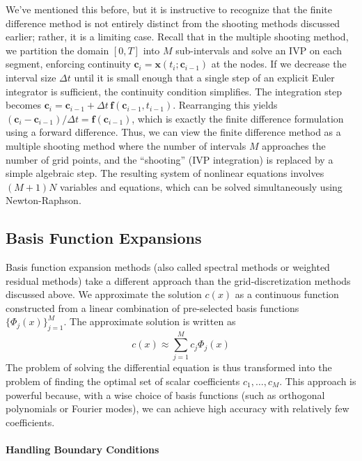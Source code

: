 We've mentioned this before, but it is instructive to recognize that the finite difference method is not entirely distinct from the shooting methods discussed earlier; rather, it is a limiting case. Recall that in the multiple shooting method, we partition the domain $[0, T]$ into $M$ sub-intervals and solve an IVP on each segment, enforcing continuity $\mathbf{c}_{i} = \mathbf{x}(t_i; \mathbf{c}_{i-1})$ at the nodes. If we decrease the interval size $\Delta t$ until it is small enough that a single step of an explicit Euler integrator is sufficient, the continuity condition simplifies. The integration step becomes $\mathbf{c}_i = \mathbf{c}_{i-1} + \Delta t \, \mathbf{f}(\mathbf{c}_{i-1}, t_{i-1})$. Rearranging this yields $(\mathbf{c}_i - \mathbf{c}_{i-1})/\Delta t = \mathbf{f}(\mathbf{c}_{i-1})$, which is exactly the finite difference formulation using a forward difference. Thus, we can view the finite difference method as a multiple shooting method where the number of intervals $M$ approaches the number of grid points, and the ``shooting'' (IVP integration) is replaced by a simple algebraic step. The resulting system of nonlinear equations involves $(M+1)N$ variables and equations, which can be solved simultaneously using Newton-Raphson.

\subsection{Basis Function Expansions}

Basis function expansion methods (also called spectral methods or weighted residual methods) take a different approach than the grid-discretization methods discussed above. We approximate the solution $c(x)$ as a continuous function constructed from a linear combination of pre-selected basis functions $\{\Phi_j(x)\}_{j=1}^M$. The approximate solution is written as
\begin{equation}
    c(x) \approx \sum_{j=1}^M c_j \Phi_j(x)
\end{equation}
The problem of solving the differential equation is thus transformed into the problem of finding the optimal set of scalar coefficients $c_1, \dots, c_M$. This approach is powerful because, with a wise choice of basis functions (such as orthogonal polynomials or Fourier modes), we can achieve high accuracy with relatively few coefficients.

\paragraph*{Handling Boundary Conditions}

